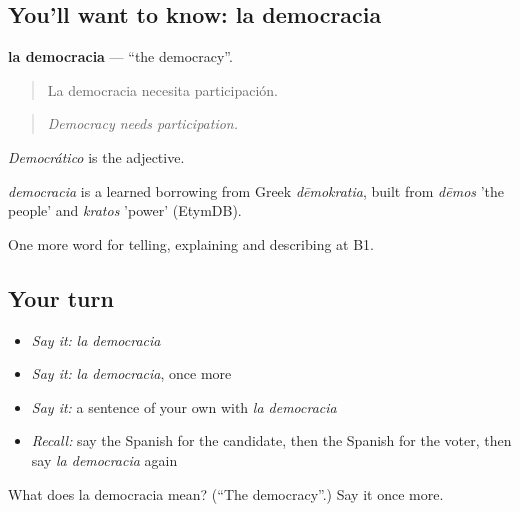 \subsection*{You'll want to know: la democracia}
\textbf{la democracia} — \textquotedblleft{}the democracy\textquotedblright{}.

\begin{quote}
La democracia necesita participación.
\end{quote}

\begin{quote}
\emph{Democracy needs participation.}
\end{quote}

\emph{Democrático} is the adjective.

\begin{cousinweb}
\emph{democracia} is a learned borrowing from Greek \emph{dēmokratia}, built from \emph{dēmos} 'the people' and \emph{kratos} 'power' (EtymDB).
\end{cousinweb}

\begin{grammarlens}[title={What you've built}]
One more word for telling, explaining and describing at B1.
\end{grammarlens}

\subsection*{Your turn}
\begin{itemize}
\raggedright
  \item \emph{Say it:} \emph{la democracia}
  \item \emph{Say it:} \emph{la democracia}, once more
  \item \emph{Say it:} a sentence of your own with \emph{la democracia}
  \item \emph{Recall:} say the Spanish for the candidate, then the Spanish for the voter, then say \emph{la democracia} again
\end{itemize}

\begin{tcolorbox}[breakable,colback=teal!4,colframe=teal!35!black,title={Before you move on}]
What does la democracia mean? (\textquotedblleft{}The democracy\textquotedblright{}.) Say it once more.
\end{tcolorbox}
